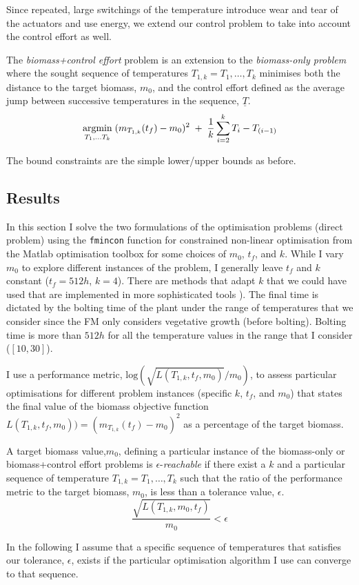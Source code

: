 Since repeated, large switchings of the temperature introduce wear and tear of
the actuators and use energy, we extend our control problem to take into account
the control effort as well.

\begin{definition}
  The \emph{biomass+control effort} problem is an extension to the
  \emph{biomass-only problem} where the sought sequence of temperatures
  $T_{1, k}=T_1, \dots, T_k$ minimises both the distance to the target biomass,
  $m_0$, and the control effort defined as the average jump between successive
  temperatures in the sequence, $\underline{T}$.
$$ \operatorname*{argmin}_{T_1, \dots T_k} \; (m_{T_{1, k}}(t_f) - m_0)^2 \; + \; \frac{1}{k} \sum_{i=2}^{k} T_i - T_{(i-1)}$$
\end{definition}
The bound constraints are the simple lower/upper bounds as before. 

\subsection{Results}
In this section I solve the two formulations of the optimisation problems
(direct problem) using the \texttt{fmincon} function for constrained non-linear
optimisation from the Matlab optimisation toolbox for some choices of $m_0$,
$t_f$, and $k$. While I vary $m_0$ to explore different instances of the
problem, I generally leave $t_f$ and $k$ constant ($t_f=512h$, $k=4$). There
are methods that adapt $k$ that we could have used that are implemented in more
sophisticated tools \citep[mesh refinement, AMIGO
tool;][]{balsa-canto_amigo2_2016}). The final time is dictated by the bolting
time of the plant under the range of temperatures that we consider since the FM
only considers vegetative growth (before bolting). Bolting time is more than
$512h$ for all the temperature values in the range that I consider
($[10, 30]$).

I use a performance metric, $\mathrm{log}(\sqrt{L(T_{1, k}, t_f, m_0)} / m_0)$,
to assess particular optimisations for different problem instances (specific
$k$, $t_f$, and $m_0$) that states the final value of the biomass objective
function $L(T_{1, k}, t_f, m_0))=(m_{T_{1, k}}(t_f) - m_0)^2$ as a percentage of
the target biomass.

\begin{definition}
  A target biomass value,$m_0$, defining a particular instance of the
  biomass-only or biomass+control effort problems is $\epsilon$-\emph{reachable}
  if there exist a $k$ and a particular sequence of temperature
  $T_{1, k}=T_1, \dots, T_k$ such that the ratio of the performance metric to the
  target biomass, $m_0$, is less than a tolerance value, $\epsilon$.
$$
\frac{\sqrt{L(T_{1, k}, m_0, t_f)}}{m_0} < \epsilon
$$
\end{definition}
In the following I assume that a specific sequence of temperatures that
satisfies our tolerance, $\epsilon$, exists if the particular optimisation
algorithm I use can converge to that sequence.

